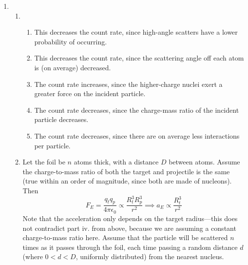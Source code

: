\documentclass[10pt]{article}
\begin{document}
\begin{enumerate}
    \item \begin{enumerate}
        \item \begin{enumerate}
            \item This decreases the count rate, since high-angle scatters have a lower probability of occurring.
            \item This decreases the count rate, since the scattering angle off each atom is (on average) decreased.
            \item The count rate increases, since the higher-charge nuclei exert a greater force on the incident particle.
            \item The count rate decreases, since the charge-mass ratio of the incident particle decreases.
            \item The count rate decreases, since there are on average less interactions per particle.
        \end{enumerate}
        \item Let the foil be $n$ atoms thick, with a distance $D$ between atoms. Assume the charge-to-mass ratio of both the target and projectile is the same (true within an order of magnitude, since both are made of nucleons). Then
        \begin{equation*}
            F_E = \frac{q_tq_p}{4\pi\epsilon_0} \propto \frac{R_t^3R_p^3}{r^2} \implies a_E \propto \frac{R_t^3}{r^2}
        \end{equation*}
        Note that the acceleration only depends on the target radius---this does not contradict part iv. from above, because we are assuming a constant charge-to-mass ratio here. Assume that the particle will be scattered $n$ times as it passes through the foil, each time passing a random distance $d$ (where $0<d<D$, uniformly distributed) from the nearest nucleus. 
    \end{enumerate}
  \end{enumerate}
\end{document}

